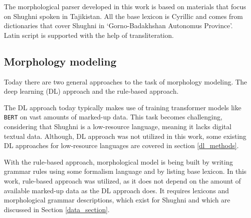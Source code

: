 The morphological parser developed in this work is based on materials that focus on Shughni spoken in Tajikistan. All the base lexicon is Cyrillic and comes from dictionaries that cover Shughni in `Gorno-Badakhshan Autonomus Province'. Latin script is supported with the help of transliteration.


\subsection{Morphology modeling}
Today there are two general approaches to the task of morphology modeling. The deep learning (DL) approach and the rule-based approach. 

The DL approach today typically makes use of training transformer models like \texttt{BERT} \parencite{devlin_2019} on vast amounts of marked-up data. This task becomes challenging, considering that Shughni is a low-resource language, meaning it lacks digital textual data. Although, DL approach was not utilized in this work, some existing DL approaches for low-resource languages are covered in section \ref{dl_methods}.

With the rule-based approach, morphological model is being built by writing grammar rules using some formalism language and by listing base lexicon. In this work, rule-based approach was utilized, as it does not depend on the amount of available marked-up data as the DL approach does. It requires lexicons and morphological grammar descriptions, which exist for Shughni and which are discussed in Section \ref{data_section}.

